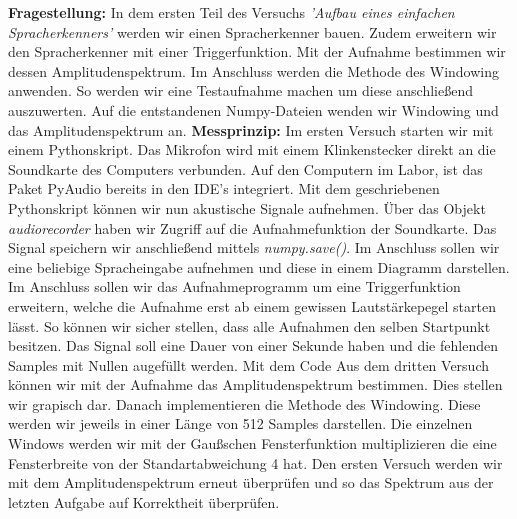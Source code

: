 \documentclass[12pt, oneside, a4paper, \docLanguage]{report}
\begin{document}
\textbf{Fragestellung:}
\newline
In dem ersten Teil des Versuchs \textit{'Aufbau eines einfachen Spracherkenners'} werden wir einen Spracherkenner bauen.
Zudem erweitern wir den Spracherkenner mit einer Triggerfunktion.
Mit der Aufnahme bestimmen wir dessen Amplitudenspektrum.
Im Anschluss werden die Methode des Windowing anwenden.
\newline
So werden wir eine Testaufnahme machen um diese anschließend auszuwerten. 
\newline
Auf die entstandenen Numpy-Dateien wenden wir Windowing und das Amplitudenspektrum an.
\newline
\newline
\textbf{Messprinzip:}
\newline
Im ersten Versuch starten wir mit einem Pythonskript. Das Mikrofon wird mit einem Klinkenstecker direkt an die Soundkarte des Computers verbunden.
Auf den Computern im Labor, ist das Paket PyAudio bereits in den IDE's integriert.
\newline
Mit dem geschriebenen Pythonskript können wir nun akustische Signale aufnehmen. 
Über das Objekt \textit{audiorecorder} haben wir Zugriff auf die Aufnahmefunktion der Soundkarte.
\newline
Das Signal speichern wir anschließend mittels \textit{numpy.save()}.
Im Anschluss sollen wir eine beliebige Spracheingabe aufnehmen und diese in einem Diagramm darstellen.
\newline
\newline
Im Anschluss sollen wir das Aufnahmeprogramm um eine Triggerfunktion erweitern, welche die Aufnahme erst ab einem gewissen Lautstärkepegel starten lässt.
\newline
So können wir sicher stellen, dass alle Aufnahmen den selben Startpunkt besitzen.
\newpage
Das Signal soll eine Dauer von einer Sekunde haben und die fehlenden Samples mit Nullen augefüllt werden.
\newline
\newline
Mit dem Code Aus dem dritten Versuch können wir mit der Aufnahme das Amplitudenspektrum bestimmen.
Dies stellen wir grapisch dar.
Danach implementieren die Methode des Windowing. 
\newline
Diese werden wir jeweils in einer Länge von 512 Samples darstellen.
Die einzelnen Windows werden wir mit der Gaußschen Fensterfunktion multiplizieren  die eine Fensterbreite von der Standartabweichung 4 hat.
\newline
Den ersten Versuch werden wir mit dem Amplitudenspektrum erneut überprüfen und so das Spektrum aus der letzten Aufgabe auf Korrektheit überprüfen.
\end{document}
